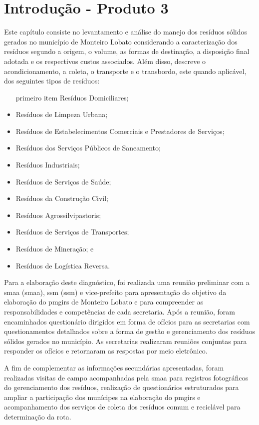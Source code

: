 	\thispagestyle{headfootimage}
	\section{Introdução - Produto 3	}
	
	Este capítulo consiste no levantamento e análise do manejo dos resíduos sólidos gerados no município de Monteiro Lobato considerando a caracterização dos resíduos segundo a origem, o volume, as formas de destinação, a disposição final adotada e os respectivos custos associados. Além disso, descreve o acondicionamento, a coleta, o transporte e o transbordo, este quando aplicável, dos seguintes tipos de resíduos:
	
	\begin{itemize}
		\item [primeiro item] Resíduos Domiciliares;
		\item Resíduos de Limpeza Urbana;
		\item Resíduos de Estabelecimentos Comerciais e Prestadores de Serviços;
		\item Resíduos dos Serviços Públicos de Saneamento;
		\item Resíduos Industriais;
		\item Resíduos de Serviços de Saúde;
		\item Resíduos da Construção Civil;
		\item Resíduos Agrossilvipastoris;
		\item Resíduos de Serviços de Transportes; 
		\item Resíduos de Mineração; e
		\item Resíduos de Logística Reversa.
	\end{itemize}
	
	Para a elaboração deste diagnóstico, foi realizada uma reunião preliminar com a \acrlong{smaa} (\acrshort{smaa}), \acrlong{ssm} (\acrshort{ssm}) e vice-prefeito para apresentação do objetivo da elaboração do \gls{pmgirs} de Monteiro Lobato e para compreender as responsabilidades e competências de cada secretaria. Após a reunião, foram encaminhados questionário dirigidos em forma de ofícios para as secretarias com questionamentos detalhados sobre a forma de gestão e gerenciamento dos resíduos sólidos gerados no município. As secretarias realizaram reuniões conjuntas para responder os ofícios e retornaram as respostas por meio eletrônico.
	
	A fim de complementar as informações secundárias apresentadas, foram realizadas visitas de campo acompanhadas pela \gls{smaa} para registros fotográficos do gerenciamento dos resíduos, realização de questionários estruturados para ampliar a participação dos munícipes na elaboração do \gls{pmgirs} e acompanhamento dos serviços de coleta dos resíduos comum e reciclável para determinação da rota.
	
